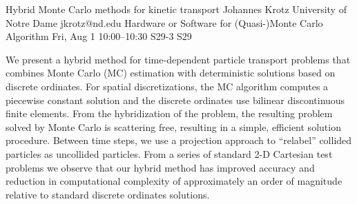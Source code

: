 \begin{talk}


\end{talk}

\begin{talk}
  {Hybrid Monte Carlo methods for kinetic transport}%
  {Johannes Krotz}%
  {University of Notre Dame}%
  {jkrotz@nd.edu}%
  {Hardware or Software for (Quasi-)Monte Carlo Algorithm}%
  {}%
  {Fri, Aug 1 10:00–10:30}%
  {S29-3}%
  {S29}%
				
			

We present a hybrid method for time-dependent particle transport problems that combines Monte Carlo (MC) estimation with deterministic solutions based on discrete ordinates. For spatial discretizations, the MC algorithm computes a piecewise constant solution and the discrete ordinates use bilinear discontinuous finite elements. From the hybridization of the problem, the resulting problem solved by Monte Carlo is scattering free, resulting in a simple, efficient solution procedure. Between time steps, we use a projection approach to “relabel” collided particles as uncollided particles. From a series of standard 2-D Cartesian test problems we observe that our hybrid method has improved accuracy and reduction in computational complexity of approximately an order of magnitude relative to standard discrete ordinates solutions.

\end{talk}
